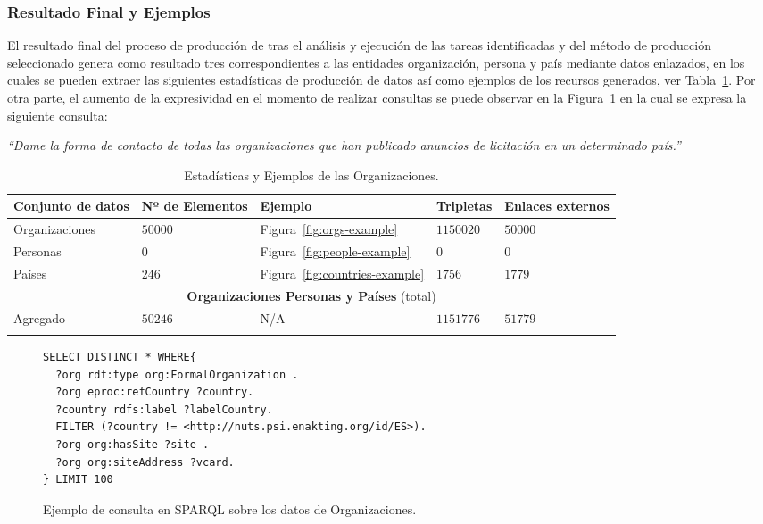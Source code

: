 \cleardoublepage

\subsubsection{Resultado Final y Ejemplos}
El resultado final del proceso de producción de \linkeddata tras el análisis y ejecución 
de las tareas identificadas y del método de producción seleccionado genera como resultado tres \datasets correspondientes 
a las entidades organización, persona y país mediante datos enlazados, en los cuales se pueden extraer las siguientes 
estadísticas de producción de datos así como ejemplos de los recursos generados, ver Tabla~\ref{table:orgs-ejemplos}. Por otra parte, 
el aumento de la expresividad en el momento de realizar consultas se puede observar en la Figura~\ref{fig:orgs-sparql-query} en la 
cual se expresa la siguiente consulta:

\begin{Frame}
\textit{``Dame la forma de contacto de todas las organizaciones que han publicado anuncios de licitación en un determinado país.''}
\end{Frame}


\begin{longtable}[c]{|p{2.5cm}|p{2.5cm}|p{1.8cm}|p{1.8cm}|p{2.5cm}|} 
\hline
  \textbf{Conjunto de datos} & \textbf{Nº de Elementos}  &  \textbf{Ejemplo} &  \textbf{Tripletas} &  \textbf{Enlaces externos}  \\\hline
\endhead
Organizaciones & $50000$  & Figura~\ref{fig:orgs-example}   & $1150020$  & $50000$   \\ \hline
Personas & $0$ &  Figura~\ref{fig:people-example}   & $0$  & $0$    \\ \hline
Países & $246$& Figura~\ref{fig:countries-example}      & $1756$  & $1779$ \\ \hline
\multicolumn{5}{|c|}{\textbf{Organizaciones Personas y Países} (total)} \\ \hline
Agregado & $50246$ &  N/A & $1151776$ & $51779$   \\ \hline
\hline
\caption{Estadísticas y Ejemplos de las Organizaciones.}\label{table:orgs-ejemplos}\\    
\end{longtable}

\begin{figure}[!htp]
\begin{lstlisting} 
SELECT DISTINCT * WHERE{
  ?org rdf:type org:FormalOrganization .
  ?org eproc:refCountry ?country.
  ?country rdfs:label ?labelCountry.
  FILTER (?country != <http://nuts.psi.enakting.org/id/ES>).  
  ?org org:hasSite ?site .
  ?org org:siteAddress ?vcard.
} LIMIT 100
\end{lstlisting}
	\caption{Ejemplo de consulta en SPARQL sobre los datos de Organizaciones.}
	\label{fig:orgs-sparql-query}
\end{figure}


